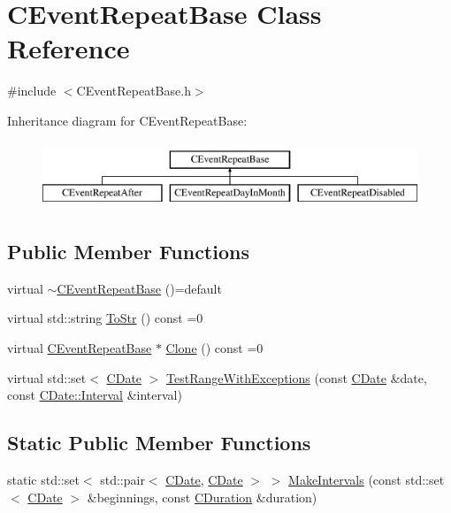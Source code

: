 \hypertarget{class_c_event_repeat_base}{}\section{C\+Event\+Repeat\+Base Class Reference}
\label{class_c_event_repeat_base}


{\ttfamily \#include $<$C\+Event\+Repeat\+Base.\+h$>$}

Inheritance diagram for C\+Event\+Repeat\+Base\+:\begin{figure}[H]
\begin{center}
\leavevmode
\includegraphics[height=2.000000cm]{class_c_event_repeat_base}
\end{center}
\end{figure}
\subsection*{Public Member Functions}
\begin{DoxyCompactItemize}
\item 
virtual \mbox{\hyperlink{class_c_event_repeat_base_a92978ac3d4425a8d70a0e491fffad471}{$\sim$\+C\+Event\+Repeat\+Base}} ()=default
\item 
virtual std\+::string \mbox{\hyperlink{class_c_event_repeat_base_acf60d2b0890fdb3e701c944b26186197}{To\+Str}} () const =0
\item 
virtual \mbox{\hyperlink{class_c_event_repeat_base}{C\+Event\+Repeat\+Base}} $\ast$ \mbox{\hyperlink{class_c_event_repeat_base_a73b079543ea6d97d38933b6a7544e349}{Clone}} () const =0
\item 
virtual std\+::set$<$ \mbox{\hyperlink{class_c_date}{C\+Date}} $>$ \mbox{\hyperlink{class_c_event_repeat_base_aac49d254d10deaed38bd83fad747f3b9}{Test\+Range\+With\+Exceptions}} (const \mbox{\hyperlink{class_c_date}{C\+Date}} \&date, const \mbox{\hyperlink{class_c_date_af23472c977b14ed341b48183ec19d874}{C\+Date\+::\+Interval}} \&interval)
\end{DoxyCompactItemize}
\subsection*{Static Public Member Functions}
\begin{DoxyCompactItemize}
\item 
static std\+::set$<$ std\+::pair$<$ \mbox{\hyperlink{class_c_date}{C\+Date}}, \mbox{\hyperlink{class_c_date}{C\+Date}} $>$ $>$ \mbox{\hyperlink{class_c_event_repeat_base_ab4f304478f81d70d9670e5e77e61de34}{Make\+Intervals}} (const std\+::set$<$ \mbox{\hyperlink{class_c_date}{C\+Date}} $>$ \&beginnings, const \mbox{\hyperlink{class_c_duration}{C\+Duration}} \&duration)
\end{DoxyCompactItemize}
